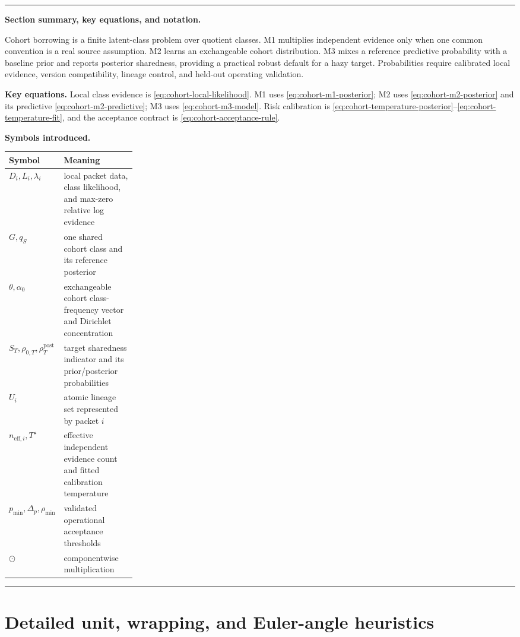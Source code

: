 \documentclass[11pt]{article}
\newenvironment{sectionrecap}
{\par\medskip\begingroup\small\noindent\rule{\linewidth}{0.4pt}\par
\smallskip\noindent\textbf{Section summary, key equations, and notation.}\par\smallskip}
{\par\smallskip\noindent\rule{\linewidth}{0.4pt}\par\endgroup\medskip}
\begin{document}
    \begin{sectionrecap}
        Cohort borrowing is a finite latent-class problem over quotient classes. M1 multiplies
        independent evidence only when one common convention is a real source assumption. M2
        learns an exchangeable cohort distribution. M3 mixes a reference predictive
        probability with a baseline prior and reports posterior sharedness, providing a practical
        robust default for a hazy target. Probabilities require calibrated local evidence,
        version compatibility, lineage control, and held-out operating validation.

        \noindent\textbf{Key equations.}
        Local class evidence is \eqref{eq:cohort-local-likelihood}. M1 uses
        \eqref{eq:cohort-m1-posterior}; M2 uses \eqref{eq:cohort-m2-posterior} and its predictive
        \eqref{eq:cohort-m2-predictive}; M3 uses \eqref{eq:cohort-m3-model}. Risk calibration is
        \eqref{eq:cohort-temperature-posterior}--\eqref{eq:cohort-temperature-fit}, and the
        acceptance contract is \eqref{eq:cohort-acceptance-rule}.

        \noindent\textbf{Symbols introduced.}
        \par\noindent\begin{tabularx}{\linewidth}{@{}p{0.25\linewidth}Y@{}}
\toprule
Symbol & Meaning \\
\midrule
$D_i,L_i,\lambda_i$ & local packet data, class likelihood, and max-zero relative log evidence \\
$G,q_S$ & one shared cohort class and its reference posterior \\
$\theta,\alpha_0$ & exchangeable cohort class-frequency vector and Dirichlet concentration \\
$S_T,\rho_{0,T},\rho_T^{\mathrm{post}}$ & target sharedness indicator and its prior/posterior probabilities \\
$U_i$ & atomic lineage set represented by packet $i$ \\
$n_{\mathrm{eff},i},T^\star$ & effective independent evidence count and fitted calibration temperature \\
$p_{\min},\Delta_p,\rho_{\min}$ & validated operational acceptance thresholds \\
$\odot$ & componentwise multiplication \\
\bottomrule
        \end{tabularx}
    \end{sectionrecap}


    \section{Detailed unit, wrapping, and Euler-angle heuristics}\label{app:heuristics}
\end{document}
